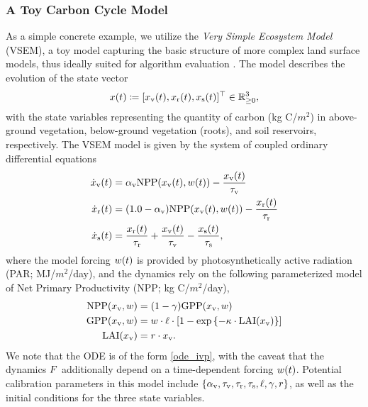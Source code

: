 \documentclass[12pt]{article}
\begin{document}
\subsubsection{A Toy Carbon Cycle Model}
As a simple concrete example, we utilize the \textit{Very Simple Ecosystem Model} (VSEM), a toy model capturing the basic 
structure of more complex land surface models, thus ideally suited for algorithm evaluation \citep{vsem}. The model 
describes the evolution of the state vector
\begin{align*}
x(t) \coloneqq [x_{\textrm{v}}(t), x_{\textrm{r}}(t), x_{\textrm{s}}(t)]^\top \in \mathbb{R}_{\geq 0}^{3}, 
\end{align*}
with the state variables representing the quantity of carbon (\textrm{kg C/$m^2$}) in above-ground vegetation, below-ground 
vegetation (roots), and soil reservoirs, respectively. The VSEM model is given by the system of coupled 
ordinary differential equations
\begin{align}
\dot{x}_{\textrm{v}}(t) &= \alpha_{\textrm{v}} \textrm{NPP}(x_{\textrm{v}}(t), w(t)) - \frac{x_{\textrm{v}}(t)}{\tau_{\textrm{v}}} \\
\dot{x}_{\textrm{r}}(t) &= (1.0 - \alpha_{\textrm{v}}) \textrm{NPP}(x_{\textrm{v}}(t), w(t)) - \frac{x_{\textrm{r}}(t)}{\tau_{\textrm{r}}} \nonumber \\ 
\dot{x}_{\textrm{s}}(t) &= \frac{x_{\textrm{r}}(t)}{\tau_{\textrm{r}}} + \frac{x_{\textrm{v}}(t)}{\tau_{\textrm{v}}} - \frac{x_{\textrm{s}}(t)}{\tau_{\textrm{s}}}, \nonumber
\end{align}
where the model forcing $w(t)$ is provided by photosynthetically active radiation 
(PAR; \textrm{MJ/$m^2$/day}), and the dynamics rely on the following parameterized model of 
Net Primary Productivity (NPP; \textrm{kg C/$m^2$/day}),
\begin{align}
\textrm{NPP}(x_{\textrm{v}}, w) &= (1 - \gamma) \textrm{GPP}(x_{\textrm{v}}, w) \\
\textrm{GPP}(x_{\textrm{v}}, w) &= w \cdot \ell \cdot \left[1 - \exp\left\{-\kappa \cdot \textrm{LAI}(x_{\textrm{v}}) \right\} \right] \nonumber \\
\textrm{LAI}(x_{\textrm{v}}) &= r \cdot x_{\textrm{v}}. \nonumber
\end{align} 
We note that the ODE is of the form \ref{ode_ivp}, with the caveat that the dynamics $F$ additionally depend on a 
time-dependent forcing $w(t)$. Potential calibration parameters in this model include 
$\{\alpha_{\textrm{v}}, \tau_{\textrm{v}}, \tau_{\textrm{r}}, \tau_{\textrm{s}}, \ell, \gamma, r\}$, as well as the initial conditions for the three state variables.

\end{document}
